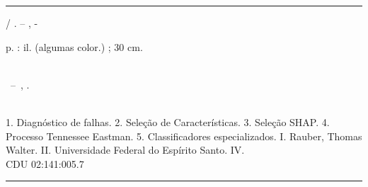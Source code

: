 \documentclass[
	12pt,				%
	openright,			%
	oneside,			%
	a4paper,			%
	english,			%
	french,				%
	spanish,			%
	brazil				%
	]{abntex2}
\begin{document}
\begin{fichacatalografica}
  \vspace*{\fill}
  \hrule
  \begin{center}
    \begin{minipage}[c]{12.5cm}

      \imprimirautor

      \hspace{0.5cm} \imprimirtitulo  / \imprimirautor. --
      \imprimirlocal, \imprimirdata-

      \hspace{0.5cm} \pageref{LastPage} p. : il. (algumas color.) ; 30 cm.\\

      \hspace{0.5cm} \imprimirorientadorRotulo~\imprimirorientador\\

      \hspace{0.5cm}
      \parbox[t]{\textwidth}{\imprimirtipotrabalho~--~\imprimirinstituicao,
        \imprimirdata.}\\

      \hspace{0.5cm}
      1. Diagnóstico de falhas.
      2. Seleção de Características.
      3. Seleção SHAP.
      4. Processo Tennessee Eastman.
      5. Classificadores especializados.
      I. Rauber, Thomas Walter.
      II. Universidade Federal do Espírito Santo.
      IV. \imprimirtitulo \\

      \hspace{8.75cm} CDU 02:141:005.7\\

    \end{minipage}
  \end{center}
  \hrule
\end{fichacatalografica}



% 
\end{document}
